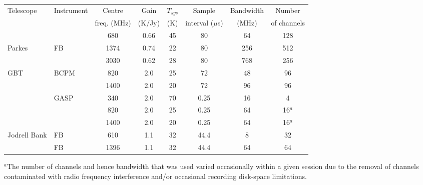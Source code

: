 \documentclass[12pt,psfig]{article}
\begin{document}
\begin{table}[ht]
\begin{center}
\begin{scriptsize}
\begin{tabular}{l|lcccccc}
\hline\hline
Telescope     &  Instrument  & Centre  &  Gain & $T_{sys}$  & Sample    & Bandwidth & Number   \\
              &   & freq. (MHz)    &  (K/Jy) & (K)   & interval ($\mu$s) & (MHz)  & of channels  \\
\hline\hline                                                                                                                                              
              &            &  680               &   0.66 &  45  &  80   &  64  &  128      \\
 Parkes       &  FB        &  1374               &  0.74 &  22  &  80   &  256 &  512      \\
              &            &  3030               &  0.62 &  28  &  80   &  768 &  256      \\
\hline                                                                                                                                                            
  GBT         & BCPM         &  820              &  2.0  &  25  &  72   &  48   &  96       \\
              &              &  1400             &  2.0  &  20  &  72   &  96   &  96       \\
\cline{2-8}                                                                                                                                               
              & GASP         &  340              &  2.0  &  70  &  0.25 &  16   &  4        \\
              &              &  820              &  2.0  &  25  &  0.25 &  64   &  16$^a$   \\
              &              &  1400             &  2.0  &  20  &  0.25 &  64   &  16$^a$   \\
\hline                                                                                                                                                            
 Jodrell Bank &  FB          &  610              &  1.1  &  32  &  44.4 &  8    &   32       \\
              &  FB          &  1396             &  1.1  &  32  &  44.4 &  64    &   64   \\
\hline
\end{tabular}
\vspace{20pt}
\newline
$^a$The number of channels and hence bandwidth that was used varied
occasionally within a given session due to the removal of 
channels contaminated with radio frequency interference and/or
occasional recording disk-space limitations.
\end{scriptsize}
\end{center}
\end{table}
\end{document}
